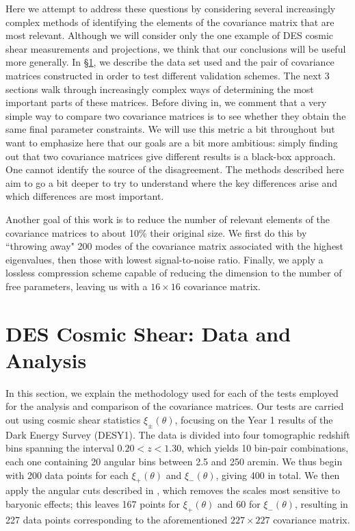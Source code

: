 \documentclass[twocolumn]{\docclass}
\begin{document}
	Here we attempt to address these questions by considering several increasingly complex methods of identifying the elements of the covariance matrix that are most relevant. Although we will consider only the one example of DES cosmic shear measurements and projections, we think that our conclusions will be useful more generally. In \S\ref{sec:methods}, we describe the data set used and the pair of covariance matrices constructed in order to test different validation schemes. The next 3 sections walk through increasingly complex ways of determining the most important parts of these matrices. Before diving in, we comment that a very simple way to compare two covariance matrices is to see whether they obtain the same final parameter constraints. We will use this metric a bit throughout but want to emphasize here that our goals are a bit more ambitious: simply finding out that two covariance matrices give different results is a black-box approach. One cannot identify the source of the disagreement. The methods described here aim to go a bit deeper to try to understand where the key differences arise and which differences are most important.
	
	Another goal of this work is to reduce the number of relevant elements of the covariance matrices to about 10\% their original size. We first do this by ``throwing away" 200 modes of the covariance matrix associated with the highest eigenvalues, then those with lowest signal-to-noise ratio. Finally, we apply a lossless compression scheme capable of reducing the dimension to the number of free parameters, leaving us with a $16 \times 16$ covariance matrix.
	
	\section{DES Cosmic Shear: Data and Analysis}
	\label{sec:methods}
	
	In this section, we explain the methodology used for each of the tests employed for the analysis and comparison of the covariance matrices. Our tests are carried out using cosmic shear statistics $\xi_\pm(\theta)$, focusing on the Year 1 results of the Dark Energy Survey \citep{Troxel:2017xyo,Abbott:2018cms} (DESY1). The data is divided into four tomographic redshift bins spanning the interval $0.20 < z < 1.30$, which yields 10 bin-pair combinations, each one containing 20 angular bins between 2.5 and 250 arcmin. We thus begin with 200 data points for each $\xi_+(\theta)$ and $\xi_-(\theta)$, giving 400 in total. We then apply the angular cuts described in \citep{Abbott:2018cms}, which removes the scales most sensitive to baryonic effects; this leaves 167 points for $\xi_+(\theta)$ and 60 for $\xi_-(\theta)$, resulting in 227 data points corresponding to the aforementioned $227 \times 227$ covariance matrix. 
	
\end{document}
